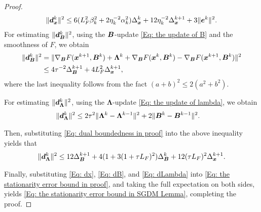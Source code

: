 \begin{proof}
    \begin{align}
        \label{Eq: dx}\| \bm{d}_{\bm{x}}^{k}\|^{2}\leq 6( L^2_{F}\beta_{k}^{2}+ 2 \eta_{k}^{-2}\alpha_{k}^{2}) \Delta_{\bm{x}}^{k}+ 12 \eta_{k}^{-2}\Delta_{\bm{x}}^{k+1}+ 3 \| \bm{e}^{k}\|^{2}.
    \end{align}
    For estimating $\|\bm{d}^{k}_{\bm{B}}\|^{2}$, using the $\bm{B}$-update
    \eqref{Eq: the update of B} and the smoothness of
    $F$, we obtain
    \begin{align}
        \|\bm{d}_{\bm{B}}^{k}\|^{2} & = \| \nabla_{\bm{B}}F(\bm{x}^{k+1}, \bm{B}^{k})+ \bm{\Lambda}^{k}+ \nabla_{\bm{B}}F(\bm{x}^{k}, \bm{B}^{k}) - \nabla_{\bm{B}}F(\bm{x}^{k+1}, \bm{B}^{k}) \|^{2}\notag \\
                              & \leq4 \tau^{-2}\Delta^{k+1}_{\bm{B}}+ 4L_{F}^{2}\Delta_{\bm{x}}^{k+1}\label{Eq: dB},
    \end{align}where the last inequality follows from the fact
    $(a + b)^{2}\leq 2(a^{2}+ b^{2})$.

    For estimating $\|\bm{d}^{k}_{\bm{\Lambda}}\|^{2}$, using the
    $\bm{\Lambda}$-update \eqref{Eq: the update of lambda}, we obtain
\begin{align}
    \|\bm{d}^{k}_{\bm{\Lambda}}\|^{2} & \leq 2\tau^{2}\|\bm{\Lambda}^{k}- \bm{\Lambda}^{k-1}\|^{2}+ 2\|\bm{B}^{k}- \bm{B}^{k-1}\|^{2}. \notag
\end{align}

    Then, substituting \eqref{Eq: dual boundedness in proof} into the above inequality yields that
    \begin{align}
        \label{Eq: dLambda}\|\bm{d}^{k}_{\bm{\Lambda}}\|^{2}\leq 12 \Delta_{\bm{B}}^{k+1}+ 4(1 + 3 (1 + \tau L_{F})^{2})\Delta_{\bm{B}}^{k}+ 12(\tau L_{F})^{2}\Delta_{\bm{x}}^{k+1}.
    \end{align}

    Finally, substituting \eqref{Eq: dx}, \eqref{Eq: dB}, and \eqref{Eq: dLambda}
    into \eqref{Eq: the stationarity error bound in proof}, and taking the full expectation
    on both sides, yields \eqref{Eq: the stationarity error bound in SGDM Lemma},
    completing the proof. 
\end{proof}

